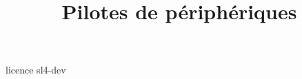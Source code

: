 \documentclass [xcolor=table] {beamer}
\title {Pilotes de périphériques}
\begin{document}
 {licence}
 {sl4-dev}
\end{document}
